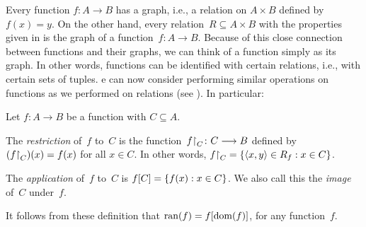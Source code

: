 \documentclass[../../../include/open-logic-section]{subfiles}
\begin{document}
\begin{explain}
Every function $f\colon A \to B$ has a graph, i.e., a relation on $A
\times B$ defined by $f(x) = y$. On the other hand, every relation~$R
\subseteq A \times B$ with the properties given in
 is the graph of a function~$f \colon A \to
B$. Because of this close connection between functions and their
graphs, we can think of a function simply as its graph. In other
words, functions can be identified with certain relations, i.e., with
certain sets of tuples. e can now consider performing similar operations on
functions as we performed on relations (see
). In particular:
\end{explain}

\begin{defn}
Let $f \colon A \to B$ be a function with $C\subseteq A$.

The \emph{restriction} of~$f$ to~$C$ is the
function~$f\mathord{\restriction}_{C}\colon C \longrightarrow B$ defined by
$(f\mathord{\restriction}_{C})(x) = f(x)$ for all $x \in C$. In other
words, $f\mathord{\restriction}_{C} = \{ \langle x, y \rangle \in R_f : x \in
C \}$.

The \emph{application} of~$f$ to~$C$ is $f[C] =
\{ f(x) : x \in C \}$. We also call this the \emph{image} of~$C$
under~$f$.
\end{defn}

\begin{explain}
It follows from these definition that $\mathrm{ran}(f) =
f[\mathrm{dom}(f)]$, for any function~$f$.
\end{explain}
\end{document}
